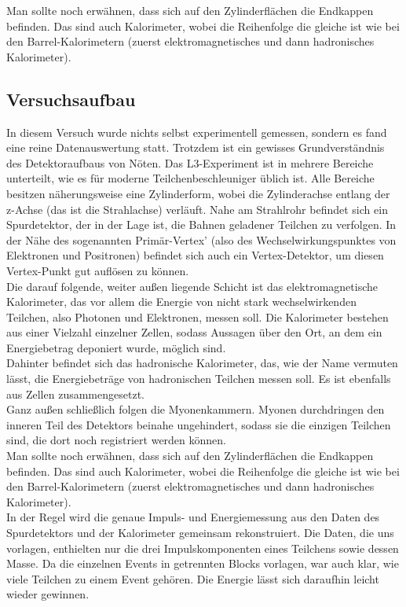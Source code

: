 Man sollte noch erwähnen, dass sich auf den Zylinderflächen die Endkappen befinden. Das sind auch Kalorimeter, wobei die Reihenfolge die gleiche ist wie bei den Barrel-Kalorimetern (zuerst elektromagnetisches und dann hadronisches Kalorimeter).

\subsection{Versuchsaufbau}
In diesem Versuch wurde nichts selbst experimentell gemessen, sondern es fand
eine reine Datenauswertung statt. Trotzdem ist ein gewisses Grundverständnis des
Detektoraufbaus von Nöten. Das L3-Experiment ist in mehrere Bereiche unterteilt,
wie es für moderne Teilchenbeschleuniger üblich ist. Alle Bereiche besitzen näherungsweise eine Zylinderform, wobei die Zylinderachse entlang der z-Achse (das ist die Strahlachse) verläuft. Nahe am Strahlrohr befindet sich ein Spurdetektor, der in der Lage ist, die Bahnen geladener Teilchen zu verfolgen. In der Nähe des sogenannten Primär-Vertex' (also des Wechselwirkungspunktes von Elektronen und Positronen) befindet sich auch ein Vertex-Detektor, um diesen Vertex-Punkt gut auflösen zu können.\\
Die darauf folgende, weiter außen liegende Schicht ist das elektromagnetische Kalorimeter, das vor allem die Energie von nicht stark wechselwirkenden Teilchen, also Photonen und Elektronen, messen soll. Die Kalorimeter bestehen aus einer Vielzahl einzelner Zellen, sodass Aussagen über den Ort, an dem ein Energiebetrag deponiert wurde, möglich sind.\\
Dahinter befindet sich das hadronische Kalorimeter, das, wie der Name vermuten lässt, die Energiebeträge von hadronischen Teilchen messen soll. Es ist ebenfalls aus Zellen zusammengesetzt.\\
Ganz außen schließlich folgen die Myonenkammern. Myonen durchdringen den inneren Teil des Detektors beinahe ungehindert, sodass sie die einzigen Teilchen sind, die dort noch registriert werden können.\\
Man sollte noch erwähnen, dass sich auf den Zylinderflächen die Endkappen befinden. Das sind auch Kalorimeter, wobei die Reihenfolge die gleiche ist wie bei den Barrel-Kalorimetern (zuerst elektromagnetisches und dann hadronisches Kalorimeter).\\
In der Regel wird die genaue Impuls- und Energiemessung aus den Daten des Spurdetektors und der Kalorimeter gemeinsam rekonstruiert. Die Daten, die uns vorlagen, enthielten nur die drei Impulskomponenten eines Teilchens sowie dessen Masse. Da die einzelnen Events in getrennten Blocks vorlagen, war auch klar, wie viele Teilchen zu einem Event gehören. Die Energie lässt sich daraufhin leicht wieder gewinnen.
